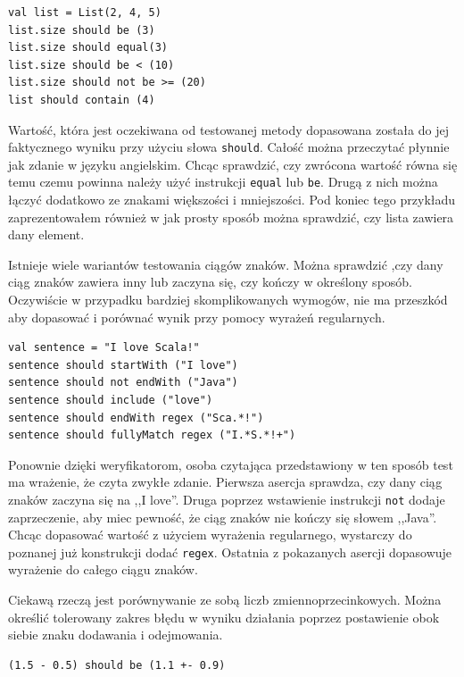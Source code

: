\documentclass[brudnopis]{xmgr}
\begin{document}
\begin{verbatim}
val list = List(2, 4, 5)
list.size should be (3)
list.size should equal(3)
list.size should be < (10)
list.size should not be >= (20)
list should contain (4)
\end{verbatim}

Wartość, która jest oczekiwana od testowanej metody dopasowana została do jej faktycznego wyniku przy użyciu słowa \texttt{should}. Całość można przeczytać płynnie jak zdanie w języku angielskim. 
Chcąc sprawdzić, czy zwrócona wartość równa się temu czemu powinna należy użyć instrukcji \texttt{equal} lub \texttt{be}. Drugą z nich można łączyć dodatkowo ze znakami większości i mniejszości. Pod koniec tego przykładu zaprezentowałem również w jak prosty sposób można sprawdzić, czy lista zawiera dany element.

Istnieje wiele wariantów testowania ciągów znaków. Można sprawdzić ,czy dany ciąg znaków zawiera inny lub zaczyna się, czy kończy w określony sposób. Oczywiście w przypadku bardziej skomplikowanych wymogów, nie ma przeszkód aby dopasować i porównać wynik przy pomocy wyrażeń regularnych.

\begin{verbatim}
val sentence = "I love Scala!"
sentence should startWith ("I love")
sentence should not endWith ("Java")
sentence should include ("love")
sentence should endWith regex ("Sca.*!")
sentence should fullyMatch regex ("I.*S.*!+")
\end{verbatim}

Ponownie dzięki weryfikatorom, osoba czytająca przedstawiony w ten sposób test ma wrażenie, że czyta zwykłe zdanie. Pierwsza asercja sprawdza, czy dany ciąg znaków zaczyna się na ,,I love''. Druga poprzez wstawienie instrukcji \texttt{not} dodaje zaprzeczenie, aby miec pewność, że ciąg znaków nie kończy się słowem ,,Java''. Chcąc dopasować wartość z użyciem wyrażenia regularnego, wystarczy do poznanej już konstrukcji dodać \texttt{regex}. Ostatnia z pokazanych asercji dopasowuje wyrażenie do całego ciągu znaków.

Ciekawą rzeczą jest porównywanie ze sobą liczb zmiennoprzecinkowych. Można określić tolerowany zakres błędu w wyniku działania poprzez postawienie obok siebie znaku dodawania i odejmowania.

\begin{verbatim}
(1.5 - 0.5) should be (1.1 +- 0.9)
\end{verbatim}
\end{document}

